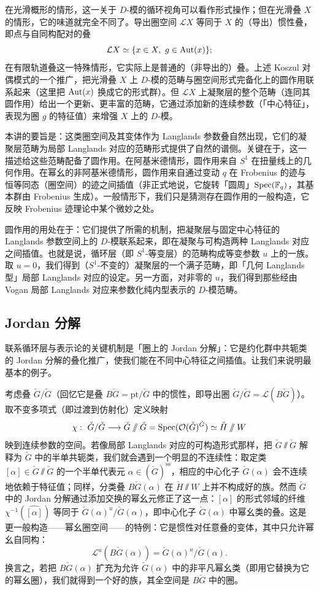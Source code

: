 在光滑概形的情形，这一关于 $D$-模的循环视角可以看作形式操作；但在光滑叠 $X$ 的情形，它的味道就完全不同了。导出圈空间 $\mathcal L X$ 等同于 $X$ 的（导出）惯性叠，即点与自同构配对的叠
\[
\mathcal L X\simeq\{x\in X,\ g\in\Aut(x)\};
\]
在有限轨道叠这一特殊情形，它实际上是普通的（非导出的）叠。上述 Koszul 对偶模式的一个推广，把光滑叠 $X$ 上 $D$-模的范畴与圈空间形式完备化上的圆作用联系起来（这里把 $\operatorname{Aut}(x)$ 换成它的形式群）。但 $\mathcal L X$ 上凝聚层的整个范畴（连同其圆作用）给出一个更新、更丰富的范畴，它通过添加新的连续参数（「中心特征」，表现为圈 $g$ 的特征值）来增强 $X$ 上的 $D$-模。

本讲的要旨是：这类圈空间及其变体作为 Langlands 参数叠自然出现，它们的凝聚层范畴为局部 Langlands 对应的范畴形式提供了自然的谱侧。关键在于，这一描述给这些范畴配备了圆作用。在阿基米德情形，圆作用来自 $S^1$ 在扭量线上的几何作用。在幂幺的非阿基米德情形，圆作用来自通过变动 $q$ 在 Frobenius 的迹与恒等同态（圈空间）的迹之间插值（非正式地说，它旋转「圆周」$\operatorname{Spec}(\mathbb{F}_q)$，其基本群由 Frobenius 生成）。一般情形下，我们只是猜测存在圆作用的一般构造，它反映 Frobenius 迹理论中某个微妙之处。

圆作用的用处在于：它们提供了所需的机制，把凝聚层与固定中心特征的 Langlands 参数空间上的 $D$-模联系起来，即在凝聚与可构造两种 Langlands 对应之间插值。也就是说，循环层（即 $S^1$-等变层）的范畴构成等变参数 $u$ 上的一族。取 $u=0$，我们得到（$S^1$-不变的）凝聚层的一个满子范畴，即「几何 Langlands 型」局部 Langlands 对应的设定。另一方面，对非零的 $u$，我们得到那些经由 Vogan 局部 Langlands 对应来参数化纯内型表示的 $D$-模范畴。

\subsection{Jordan 分解}

联系循环层与表示论的关键机制是「圈上的 Jordan 分解」：它是约化群中共轭类的 Jordan 分解的叠化推广，使我们能在不同中心特征之间插值。让我们来说明最基本的例子。

考虑叠 $\check G/\check G$（回忆它是叠 $B\check G=\mathrm{pt}/\check G$ 中的惯性，即导出圈 $\check G/\check G=\mathcal L(B\check G)$）。取不变多项式（即过渡到仿射化）定义映射
\[
\chi:\ \check G/\check G\longrightarrow\check G\sslash\check G=\operatorname{Spec}(\mathcal{O}(\check G)^{\check G})\simeq\check H\sslash W
\]
映到连续参数的空间。若像局部 Langlands 对应的可构造形式那样，把 $\check G\sslash\check G$ 解释为 $\check G$ 中的半单共轭类，我们就会遇到一个明显的不连续性：取定类 $[\alpha]\in\check G\sslash\check G$ 的一个半单代表元 $\alpha\in(\check G)^{\mathrm{ss}}$，相应的中心化子 $\check G(\alpha)$ 会不连续地依赖于特征值；同样，分类叠 $B\check G(\alpha)$ 在 $\check H\sslash W$ 上并不构成好的族。然而 $\check G$ 中的 Jordan 分解通过添加交换的幂幺元修正了这一点：$[\alpha]$ 的形式邻域的纤维 $\chi^{-1}(\widehat{[\alpha]})$ 等同于 $\check G(\alpha)^u/\check G(\alpha)$，即中心化子 $\check G(\alpha)$ 中幂幺类的叠。这是更一般构造——幂幺圈空间——的特例：它是惯性对任意叠的变体，其中只允许幂幺自同构：
\[
\mathcal L^u(B\check G(\alpha))=\check G(\alpha)^u/\check G(\alpha).
\]
换言之，若把 $B\check G(\alpha)$ 扩充为允许 $\check G(\alpha)$ 中的非平凡幂幺类（即用它替换为它的幂幺圈），我们就得到一个好的族，其全空间是 $B\check G$ 中的圈。

